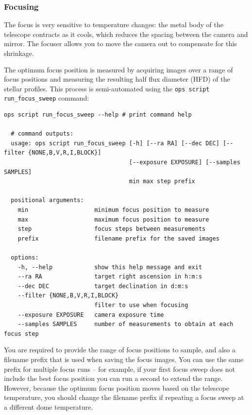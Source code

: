 \documentclass[12pt,a4paper]{article}
\begin{document}
\subsubsection{Focusing}

The focus is very sensitive to temperature changes: the metal body of the telescope contracts as it cools, which reduces the spacing between the camera and mirror. The focuser allows you to move the camera out to compensate for this shrinkage.

The optimum focus position is measured by acquiring images over a range of focus positions and measuring the resulting half flux diameter (HFD) of the stellar profiles. This process is semi-automated using the \texttt{ops script run\_focus\_sweep} command:
\\
\begin{lstlisting}[language=commands]
  ops script run_focus_sweep --help # print command help

  # command outputs:
  usage: ops script run_focus_sweep [-h] [--ra RA] [--dec DEC] [--filter {NONE,B,V,R,I,BLOCK}]
                                    [--exposure EXPOSURE] [--samples SAMPLES]
                                    min max step prefix
  
  positional arguments:
    min                   minimum focus position to measure
    max                   maximum focus position to measure
    step                  focus steps between measurements
    prefix                filename prefix for the saved images
  
  options:
    -h, --help            show this help message and exit
    --ra RA               target right ascension in h:m:s
    --dec DEC             target declination in d:m:s
    --filter {NONE,B,V,R,I,BLOCK}
                          filter to use when focusing
    --exposure EXPOSURE   camera exposure time
    --samples SAMPLES     number of measurements to obtain at each focus step
\end{lstlisting}

You are required to provide the range of focus positions to sample, and also a filename prefix that is used when saving the focus images. You can use the same prefix for multiple focus runs -- for example, if your first focus sweep does not include the best focus position you can run a second to extend the range. However, because the optimum focus position moves based on the telescope temperature, you should change the filename prefix if repeating a focus sweep at a different dome temperature.
\end{document}

